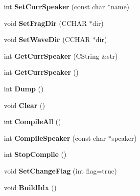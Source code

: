 \begin{DoxyCompactItemize}
\item 
\hypertarget{class_c_frag_coll_arr_ac92403d269b1b8817696c75362ce3208}{int {\bfseries Set\-Curr\-Speaker} (const char $\ast$name)}\label{class_c_frag_coll_arr_ac92403d269b1b8817696c75362ce3208}

\item 
\hypertarget{class_c_frag_coll_arr_a8dfaf3de5a1bc27fe26d19a396969e72}{void {\bfseries Set\-Frag\-Dir} (C\-C\-H\-A\-R $\ast$dir)}\label{class_c_frag_coll_arr_a8dfaf3de5a1bc27fe26d19a396969e72}

\item 
\hypertarget{class_c_frag_coll_arr_a3baf98c3fef4779417b22f78ffe88017}{void {\bfseries Set\-Wave\-Dir} (C\-C\-H\-A\-R $\ast$dir)}\label{class_c_frag_coll_arr_a3baf98c3fef4779417b22f78ffe88017}

\item 
\hypertarget{class_c_frag_coll_arr_a6cdbe2ab010d4eeef1885eff17aecfce}{int {\bfseries Get\-Curr\-Speaker} (C\-String \&str)}\label{class_c_frag_coll_arr_a6cdbe2ab010d4eeef1885eff17aecfce}

\item 
\hypertarget{class_c_frag_coll_arr_af0fbb8804b3ce02dece073deff5a4af9}{int {\bfseries Get\-Curr\-Speaker} ()}\label{class_c_frag_coll_arr_af0fbb8804b3ce02dece073deff5a4af9}

\item 
\hypertarget{class_c_frag_coll_arr_a81abfed8c1eefad9607d2c545c6cc756}{int {\bfseries Dump} ()}\label{class_c_frag_coll_arr_a81abfed8c1eefad9607d2c545c6cc756}

\item 
\hypertarget{class_c_frag_coll_arr_a53d022301ae94ae011ef5d6ca3e92904}{void {\bfseries Clear} ()}\label{class_c_frag_coll_arr_a53d022301ae94ae011ef5d6ca3e92904}

\item 
\hypertarget{class_c_frag_coll_arr_adfb56190a9b3eed8fb3e3126539e88c2}{int {\bfseries Compile\-All} ()}\label{class_c_frag_coll_arr_adfb56190a9b3eed8fb3e3126539e88c2}

\item 
\hypertarget{class_c_frag_coll_arr_a38387fa1180392a447556fea1b5dce9c}{int {\bfseries Compile\-Speaker} (const char $\ast$speaker)}\label{class_c_frag_coll_arr_a38387fa1180392a447556fea1b5dce9c}

\item 
\hypertarget{class_c_frag_coll_arr_ab1ed8e641f7eea6b802cfe09559aa388}{int {\bfseries Stop\-Compile} ()}\label{class_c_frag_coll_arr_ab1ed8e641f7eea6b802cfe09559aa388}

\item 
\hypertarget{class_c_frag_coll_arr_ae86286779ff02f6d4f3e6d103b78d1b2}{void {\bfseries Set\-Change\-Flag} (int flag=true)}\label{class_c_frag_coll_arr_ae86286779ff02f6d4f3e6d103b78d1b2}

\item 
\hypertarget{class_c_frag_coll_arr_a264865114e470daf76cffa0d717b3ba6}{void {\bfseries Build\-Idx} ()}\label{class_c_frag_coll_arr_a264865114e470daf76cffa0d717b3ba6}

\end{DoxyCompactItemize}
